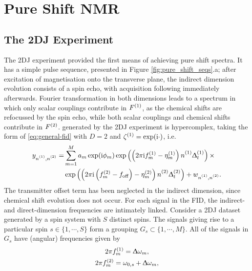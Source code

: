 \section{Pure Shift NMR}

\subsection{The \acl{2DJ} Experiment}
The \ac{2DJ} experiment\cite{Aue1976, Morris2009} provided the first means of
achieving pure shift spectra. It has a simple pulse sequence, presented in
Figure \ref{fig:pure_shift_seqs}.a; after excitation of magnetisation onto the
transverse plane, the indirect dimension evolution consists of a spin echo, with
acquisition following immediately afterwards. Fourier transformation in both
dimensions leads to a spectrum in which only scalar couplings contribute in
$F^{(1)}$, as the chemical shifts are refocussed by the spin echo, while both
scalar couplings and chemical shifts contribute in $F^{(2)}$.
 generated by the \ac{2DJ} experiment is hypercomplex, taking the form
of \eqref{eq:general-fid} with $D=2$ and $\zeta^{(1)} = \exp(\mathrm{i}\cdot)$, i.e.
\begin{equation}%
    \begin{split}%
        y_{\none,\ntwo} =
        &\sum_{m=1}^{M} a_m \exp(\iu \phi_m)
            \exp\left(\left(2 \pi \iu \fonem - \etaonem\right) \none \Dtone\right) \times \\
        &\exp\left(\left(2 \pi \iu  \left(\ftwom - \foff\right)
            - \etatwom\right) \ntwo \Dttwo\right)
            + w_{\none,\ntwo}.
    \end{split}%
    \label{eq:jres-fid}
\end{equation}%
The transmitter offset term has been neglected in the indirect dimension, since
chemical shift evolution does not occur.
For each signal in the \ac{FID}, the indirect- and direct-dimension
frequencies are intimately linked. Consider a \ac{2DJ} dataset generated by a
spin system with $S$ distinct spins. The signals giving rise to a particular
spin $s \in \lbrace 1, \cdots, S \rbrace$ form a grouping $G_s
\subset \lbrace 1, \cdots, M \rbrace$. All of the signals in $G_s$
have (angular) frequencies given by
\begin{subequations}
    \begin{gather}
        2 \pi f_m^{(1)} = \Updelta \omega_m,\\
        2 \pi f_m^{(2)} = \omega_{0,s} + \Updelta \omega_m,
    \end{gather}
    \label{eq:f1-f2-2dj}
\end{subequations}
